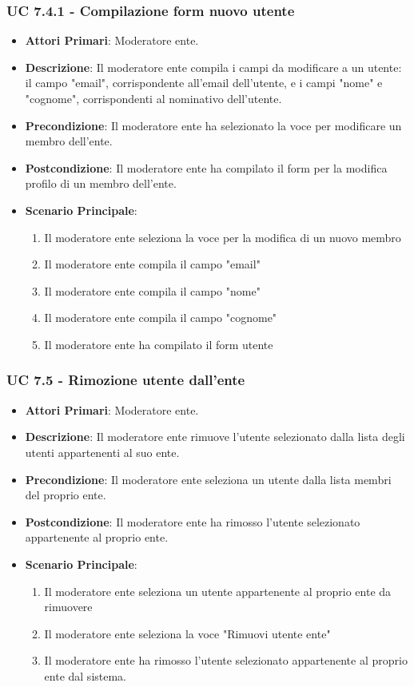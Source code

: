 			\subsubsection{UC 7.4.1 - Compilazione form nuovo utente}
			\begin{itemize}
				\item \textbf{Attori Primari}: Moderatore ente.
				\item \textbf{Descrizione}: Il moderatore ente compila i campi da modificare a un utente: il campo "email", corrispondente all'email dell'utente, e i campi "nome" e "cognome", corrispondenti al nominativo dell'utente.
				\item \textbf{Precondizione}: Il moderatore ente ha selezionato la voce per modificare un membro dell'ente.
				\item \textbf{Postcondizione}: Il moderatore ente ha compilato il form per la modifica profilo di un membro dell'ente.
				\item \textbf{Scenario Principale}:
				\begin{enumerate}
					\item{Il moderatore ente seleziona la voce per la modifica di un nuovo membro}
					\item{Il moderatore ente compila il campo "email"}
					\item{Il moderatore ente compila il campo "nome"}
					\item{Il moderatore ente compila il campo "cognome"}
					\item{Il moderatore ente ha compilato il form utente}
				\end{enumerate}	
			\end{itemize}

			
			\subsubsection{UC 7.5 - Rimozione utente dall'ente}
			\begin{itemize}
				\item \textbf{Attori Primari}: Moderatore ente.
				\item \textbf{Descrizione}: Il moderatore ente rimuove l'utente selezionato dalla lista degli utenti appartenenti al suo ente.
				\item \textbf{Precondizione}: Il moderatore ente seleziona un utente dalla lista membri del proprio ente.
				\item \textbf{Postcondizione}: Il moderatore ente ha rimosso l'utente selezionato appartenente al proprio ente.
				\item \textbf{Scenario Principale}:
				\begin{enumerate}
					\item{Il moderatore ente seleziona un utente appartenente al proprio ente da rimuovere}
					\item{Il moderatore ente seleziona la voce "Rimuovi utente ente"}
					\item{Il moderatore ente ha rimosso l'utente selezionato appartenente al proprio ente dal sistema.}
				\end{enumerate}		
			\end{itemize}